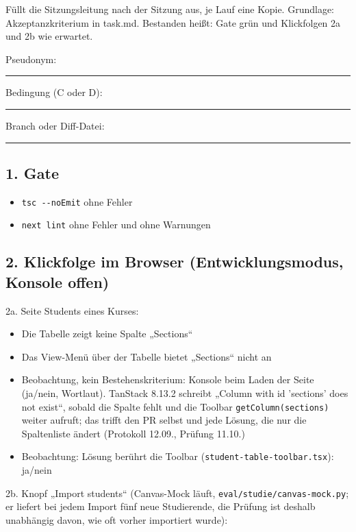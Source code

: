 Füllt die Sitzungsleitung nach der Sitzung aus, je Lauf eine Kopie. Grundlage: Akzeptanzkriterium in task.md. Bestanden heißt: Gate grün und Klickfolgen 2a und 2b wie erwartet.

\noindent Pseudonym:~\rule{2.5em}{0.4pt}\par
\noindent Bedingung (C oder D):~\rule{2.5em}{0.4pt}\par
\noindent Branch oder Diff-Datei:~\rule{2.5em}{0.4pt}\par
\subsection*{1. Gate}

\begin{itemize}[nosep,leftmargin=2.4em]
\item[\kreuz] \texttt{tsc -{}-noEmit} ohne Fehler
\item[\kreuz] \texttt{next lint} ohne Fehler und ohne Warnungen
\end{itemize}
\subsection*{2. Klickfolge im Browser (Entwicklungsmodus, Konsole offen)}

2a. Seite Students eines Kurses:

\begin{itemize}[nosep,leftmargin=2.4em]
\item[\kreuz] Die Tabelle zeigt keine Spalte „Sections“
\item[\kreuz] Das View-Menü über der Tabelle bietet „Sections“ nicht an
\item[--] Beobachtung, kein Bestehenskriterium: Konsole beim Laden der Seite (ja/nein, Wortlaut). TanStack 8.13.2 schreibt „Column with id 'sections' does not exist“, sobald die Spalte fehlt und die Toolbar \texttt{getColumn(\textquotedbl{}sections\textquotedbl{})} weiter aufruft; das trifft den PR selbst und jede Lösung, die nur die Spaltenliste ändert (Protokoll 12.09., Prüfung 11.10.)
\item[--] Beobachtung: Lösung berührt die Toolbar (\texttt{student-\allowbreak{}table-\allowbreak{}toolbar.tsx}): ja/nein
\end{itemize}
2b. Knopf „Import students“ (Canvas-Mock läuft, \texttt{eval/\allowbreak{}studie/\allowbreak{}canvas-\allowbreak{}mock.py}; er liefert bei jedem Import fünf neue Studierende, die Prüfung ist deshalb unabhängig davon, wie oft vorher importiert wurde):

